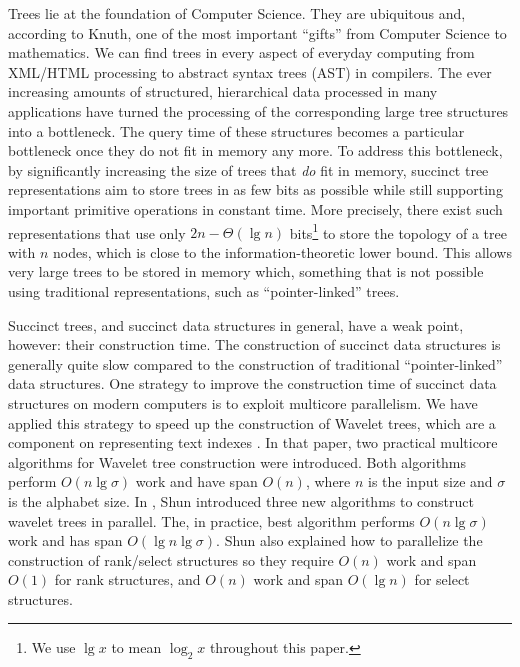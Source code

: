 Trees lie at the foundation of Computer Science. They are ubiquitous
and, according to Knuth, one of the most important ``gifts'' from
Computer Science to mathematics. We can find trees in every aspect of
everyday computing from XML/HTML processing to abstract syntax trees
(AST) in compilers.  The ever increasing amounts of structured,
hierarchical data processed in many applications have turned the
processing of the corresponding large tree structures into a
bottleneck.  The query time of these structures becomes a particular
bottleneck once they do not fit in memory any more.  To address this
bottleneck, by significantly increasing the size of trees that
\emph{do} fit in memory, succinct tree representations aim to store
trees in as few bits as possible while still supporting important
primitive operations in constant time.  More precisely, there exist
such representations that use only $2n - \Theta(\lg n)$
bits\footnote{We use $\lg x$ to mean $\log_{2}x$ throughout this
paper.} to store the topology of a tree with $n$ nodes, which is close
to the information-theoretic lower bound.  This allows very large
trees to be stored in memory which, something that is not possible
using traditional representations, such as ``pointer-linked'' trees.

Succinct trees, and succinct data structures in general, have a weak
point, however: their construction time. The construction of succinct
data structures is generally quite slow compared to the construction
of traditional ``pointer-linked'' data structures.  One strategy to
improve the construction time of succinct data structures on modern
computers is to exploit multicore parallelism.  We have applied this
strategy to speed up the construction of Wavelet trees, which are a
component on representing text indexes \cite{Fuentes2014}.  In that
paper, two practical multicore algorithms for Wavelet tree
construction were introduced. Both algorithms perform $O(n\lg \sigma)$
work and have span $O(n)$, where $n$ is the input size and $\sigma$ is
the alphabet size. In \cite{DBLP:journals/corr/Shun14}, Shun
introduced three new algorithms to construct wavelet trees in
parallel. The, in practice, best algorithm performs $O(n\lg \sigma)$
work and has span $O(\lg n\lg \sigma)$.  Shun also explained how to
parallelize the construction of rank/select structures so they require
$O(n)$ work and span $O(1)$ for rank structures, and $O(n)$ work and
span $O(\lg n)$ for select structures.

